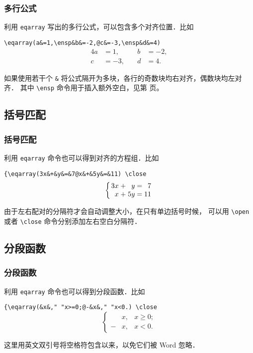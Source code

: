 \documentclass[12pt,notheorems,xcolor={rgb}]{beamer}
\let\lst=\lstinline
\newenvironment{multieqns}{
  \setlength{\arraycolsep}{0.14em}
  \begin{array}{*{12}{rc}}
}{
  \end{array}
}
\newenvironment{framex}{\begin{frame}[fragile=singleslide,environment=framex]}{\end{frame}}
\def\warn#1{\textcolor{accent3}{#1}}
\begin{document}
\begin{framex}
\frametitle{多行公式}
利用 \lst!eqarray! 写出的多行公式，可以包含多个对齐位置．比如
\begin{examplev}
\lst!\eqarray(a&=1,\ensp&b&=-2,@c&=-3,\ensp&d&=4) !
\tcblower
\begin{alignat*}{4}
a&=1,  & \quad b&=-2, \\
c&=-3, & \quad d&=4.
\end{alignat*}
\end{examplev}
如果使用若干个  \lst!&! 将公式隔开为多块，各行的奇数块均\warn{右}对齐，偶数块均\warn{左}对齐．
其中 \lst!\ensp! 命令用于插入额外空白，见第 \pageref{space} 页。%
\end{framex}

\subsection{括号匹配}

\begin{framex}
\frametitle{括号匹配}
利用 \lst!eqarray! 命令也可以得到对齐的方程组．比如
\begin{examplev}
\lst!{\eqarray(3x&+&y&=&7@x&+&5y&=&11) \close  !
\tcblower
$$\left\{\begin{multieqns}
3x &+& y &=& 7 \\ x &+& 5y &=& 11
\end{multieqns}\right.$$
\end{examplev}
由于左右配对的分隔符才会自动调整大小，在只有单边括号时候，
可以用 \lst!\open! 或者 \lst!\close! 命令分别添加左右空白分隔符．
\end{framex}

\subsection{分段函数}

\begin{framex}
\frametitle{分段函数}
利用 \lst!eqarray! 命令也可以得到分段函数．比如
\begin{examplev}
\lst!{\eqarray(&x&," "x>=0;@-&x&," "x<0.) \close  !
\tcblower
$$\left\{\begin{aligned}
 &x, &  x \ge 0; \\
-&x, &  x < 0.
\end{aligned}\right.$$
\end{examplev}
这里用英文双引号将空格符包含以来，以免它们被  Word 忽略．
\end{framex}
\end{document}
